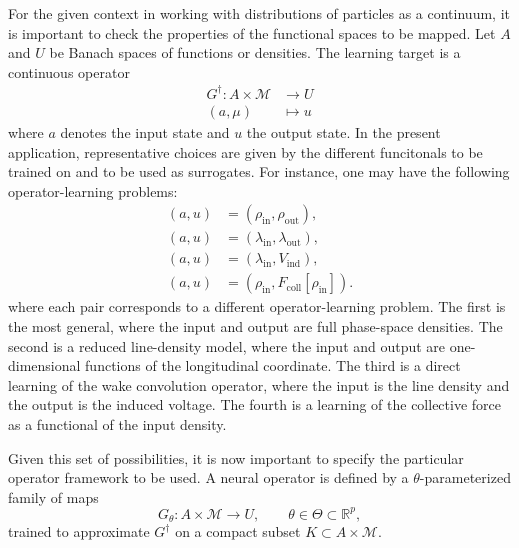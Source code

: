 \documentclass[11pt,a4paper]{article}
\begin{document}
\begin{sloppypar}
For the given context in working with distributions of particles as a continuum, it is important to check the properties of the functional spaces to be mapped. Let $A$ and $U$ be Banach spaces of functions or densities. The learning target is a continuous operator
\begin{equation}
    \begin{split}
         G^\dagger : A \times \mathcal{M} &\to U\\
                    (a,\mu) &\mapsto u
    \end{split}
 \label{eq:true-operator}
\end{equation}
where $a$ denotes the input state and $u$ the output state. In the present application, representative choices are given by the different funcitonals to be trained on and to be used as surrogates. For instance, one may have the following operator-learning problems:
\begin{equation}
    \begin{split}
        (a,u) &= (\rho_{\mathrm{in}},  \rho_{\mathrm{out}}), \\
        (a,u) &= (\lambda_{\mathrm{in}},  \lambda_{\mathrm{out}}), \\
        (a,u) &= (\lambda_{\mathrm{in}},  V_{\mathrm{ind}}), \\
        (a,u) &= (\rho_{\mathrm{in}},  F_{\mathrm{coll}}[\rho_{\mathrm{in}}]).
    \end{split}
\end{equation}
where each pair corresponds to a different operator-learning problem. The first is the most general, where the input and output are full phase-space densities. The second is a reduced line-density model, where the input and output are one-dimensional functions of the longitudinal coordinate. The third is a direct learning of the wake convolution operator, where the input is the line density and the output is the induced voltage. The fourth is a learning of the collective force as a functional of the input density.

Given this set of possibilities, it is now important to specify the particular operator framework to be used. A neural operator is defined by a $\theta$-parameterized family of maps
\begin{equation}
 G_\theta : A \times \mathcal{M} \to U,
 \qquad \theta \in \Theta \subset \mathbb{R}^p,
 \label{eq:learned-operator}
\end{equation}
trained to approximate $G^\dagger$ on a compact subset $K \subset A \times \mathcal{M}$.


\end{sloppypar}
\end{document}
